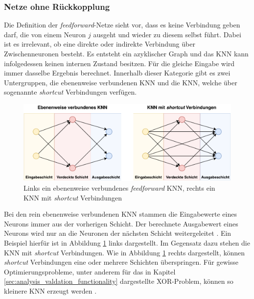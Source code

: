 \subsubsection{Netze ohne Rückkopplung}
Die Definition der \emph{feedforward}-Netze sieht vor, dass es keine Verbindung geben darf, die von einem Neuron $j$ ausgeht und wieder zu diesem selbst führt. Dabei ist es irrelevant, ob eine direkte oder indirekte Verbindung über Zwischenneuronen besteht. Es entsteht ein azyklischer Graph \cite{zell2003simulation} und das \ac{KNN} kann infolgedessen keinen internen Zustand besitzen. Für die gleiche Eingabe wird immer dasselbe Ergebnis berechnet. Innerhalb dieser Kategorie gibt es zwei Untergruppen, die ebenenweise verbundenen \ac{KNN} und die \ac{KNN}, welche über sogenannte \emph{shortcut} Verbindungen verfügen.
\begin{figure}[h]
	\centering
	\includegraphics[width=1.0\textwidth]{./img/neural_network_basics/feed_forward_networks.pdf} 
	\caption{Links ein ebenenweise verbundenes \emph{feedforward} KNN, rechts ein KNN mit \emph{shortcut} Verbindungen}
	\label{fig:feed_forward_network_structures}
\end{figure}
Bei den rein ebenenweise verbundenen \ac{KNN} stammen die Eingabewerte eines Neurons immer aus der vorherigen Schicht. Der berechnete Ausgabewert eines Neurons wird nur an die Neuronen der nächsten Schicht weitergeleitet \cite{zell2003simulation}. Ein Beispiel hierfür ist in Abbildung \ref{fig:feed_forward_network_structures} links dargestellt. Im Gegensatz dazu stehen die \ac{KNN} mit \emph{shortcut} Verbindungen. Wie in Abbildung \ref{fig:feed_forward_network_structures} rechts dargestellt, können \emph{shortcut} Verbindungen eine oder mehrere Schichten überspringen. Für gewisse Optimierungsprobleme, unter anderem für das in Kapitel \ref{sec:analysis_valdation_functionality} dargestellte XOR-Problem, können so kleinere \ac{KNN} erzeugt werden \cite{zell2003simulation}. 

